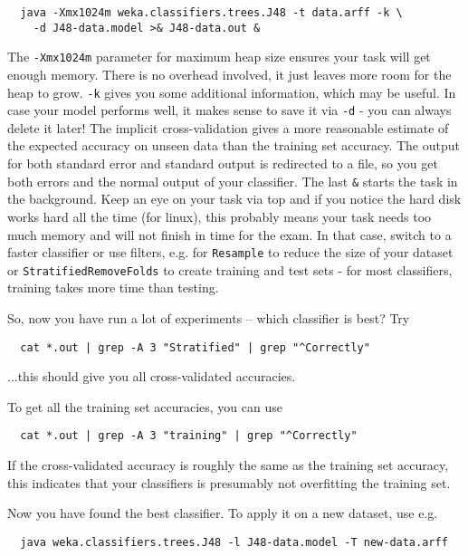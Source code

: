 {\scriptsize
\begin{verbatim}
  java -Xmx1024m weka.classifiers.trees.J48 -t data.arff -k \
    -d J48-data.model >& J48-data.out &
\end{verbatim}}

The \texttt{-Xmx1024m} parameter for maximum heap size ensures your task will get enough memory. There is no overhead involved, it just leaves more room for the heap to grow. \texttt{-k} gives you some additional information, which may be useful. In case your model performs well, it makes sense to save it via \texttt{-d} - you can always delete it later! The implicit cross-validation gives a more reasonable estimate of the expected accuracy on unseen data than the training set accuracy. The output for both standard error and standard output is redirected to a file, so you get both errors and the normal output of your classifier. The last \texttt{\&} starts the task in the background. Keep an eye on your task via top and if you notice the hard disk works hard all the time (for linux), this probably means your task needs too much memory and will not finish in time for the exam. In that case, switch to a faster classifier or use filters, e.g. for \texttt{Resample} to reduce the size of your dataset or \texttt{StratifiedRemoveFolds} to create training and test sets - for most classifiers, training takes more time than testing.

So, now you have run a lot of experiments -- which classifier is best? Try

{\scriptsize
\begin{verbatim}
  cat *.out | grep -A 3 "Stratified" | grep "^Correctly"
\end{verbatim}}

\noindent ...this should give you all cross-validated accuracies.

To get all the training set accuracies, you can use

{\scriptsize
\begin{verbatim}
  cat *.out | grep -A 3 "training" | grep "^Correctly"
\end{verbatim}}

If the cross-validated accuracy is roughly the same as the training set accuracy, this indicates that your classifiers is presumably not overfitting the training set.

Now you have found the best classifier. To apply it on a new dataset, use e.g.

{\scriptsize
\begin{verbatim}
  java weka.classifiers.trees.J48 -l J48-data.model -T new-data.arff
\end{verbatim}}


